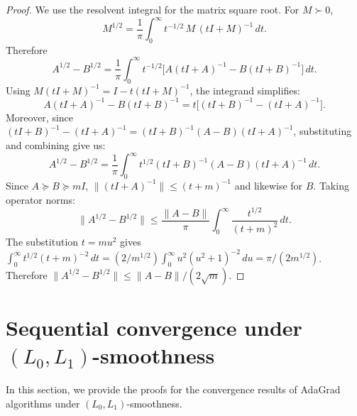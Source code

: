 \documentclass{article}
\theoremstyle{plain}
\theoremstyle{definition}
\theoremstyle{remark}
\newcommand{\norm}[1]{\| #1 \|}
\begin{document}
\begin{proof}
We use the resolvent integral for the matrix square root.
For $M \succ 0$,
\[
  M^{1/2}
  = \frac{1}{\pi}\int_0^{\infty} t^{-1/2}\,M\,(tI+M)^{-1}\,dt.
\]
Therefore
\[
  A^{1/2} - B^{1/2}
  = \frac{1}{\pi}\int_0^{\infty}
    t^{-1/2}\bigl[A(tI+A)^{-1} - B(tI+B)^{-1}\bigr]\,dt.
\]
Using $M(tI+M)^{-1} = I - t(tI+M)^{-1}$, the integrand simplifies:
\[
  A(tI+A)^{-1} - B(tI+B)^{-1}
  = t\bigl[(tI+B)^{-1} - (tI+A)^{-1}\bigr].
\]
Moreover, since
$(tI+B)^{-1} - (tI+A)^{-1} = (tI+B)^{-1}(A-B)(tI+A)^{-1}$,
substituting and combining give us:
\[
  A^{1/2} - B^{1/2}
  = \frac{1}{\pi}\int_0^{\infty}
    t^{1/2}(tI+B)^{-1}(A-B)(tI+A)^{-1}\,dt.
\]
Since $A \succeq B \succeq mI$,
$\norm{(tI+A)^{-1}} \leq (t+m)^{-1}$ and likewise for $B$.
Taking operator norms:
\[
  \norm{A^{1/2} - B^{1/2}}
  \leq \frac{\norm{A-B}}{\pi}
       \int_0^{\infty} \frac{t^{1/2}}{(t+m)^2}\,dt.
\]
The substitution $t = m u^2$ gives
$\int_0^{\infty} t^{1/2}(t+m)^{-2}\,dt
= (2/m^{1/2})\int_0^{\infty} u^2(u^2+1)^{-2}\,du
= \pi/(2m^{1/2})$.
Therefore
$\norm{A^{1/2}-B^{1/2}} \leq \norm{A-B}/(2\sqrt{m})$.
\end{proof}



\section{Sequential convergence under $(L_0, L_1)$-smoothness}

In this section, we provide the proofs for the convergence results of AdaGrad algorithms under $(L_0, L_1)$-smoothness.
\end{document}

